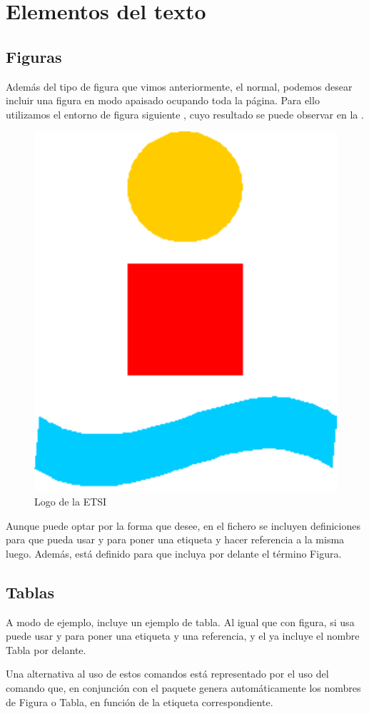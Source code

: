 \section{Elementos del texto}
%

\subsection{Figuras}

Además del tipo de figura que vimos anteriormente, el normal, podemos desear incluir una figura en modo apaisado ocupando toda la página. Para ello utilizamos el entorno de figura siguiente , cuyo resultado se puede observar en la . 

\begin{figure}
\centering
\includegraphics[width=3 cm]{CapituloLibroETSI/figuras/logoESI.pdf}
\caption{Logo de la ETSI}
\end{figure}

Aunque puede optar por la forma que desee, en el fichero  se incluyen definiciones para que pueda usar  y  para poner una etiqueta y hacer referencia a la misma luego. Además, está definido para que  incluya por delante el término Figura.

\subsection{Tablas}
A modo de ejemplo,  incluye un ejemplo de tabla. Al igual que con figura, si usa  puede usar  y  para poner una etiqueta y una referencia, y el  ya incluye el nombre Tabla por delante.

Una alternativa al uso de estos comandos está representado por el uso del comando  que, en conjunción con el paquete  genera automáticamente los nombres de Figura o Tabla, en función de la etiqueta correspondiente.

